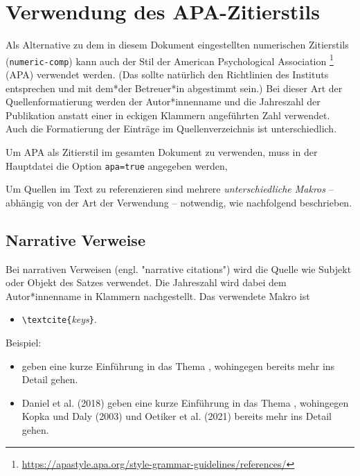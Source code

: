 \section{Verwendung des APA-Zitierstils}
\label{sec:APA}

\begin{sloppypar}
Als Alternative zu dem in diesem Dokument eingestellten numerischen
Zitierstils (\texttt{numeric-comp}) kann auch der Stil der American
Psychological Association%
\footnote{\url{https://apastyle.apa.org/style-grammar-guidelines/references/}}
(APA) verwendet werden. (Das sollte natürlich den Richtlinien des Instituts
entsprechen und mit dem*der Betreuer*in abgestimmt sein.) Bei dieser Art der
Quellenformatierung werden der Autor*innenname und die Jahreszahl der
Publikation anstatt einer in eckigen Klammern angeführten Zahl verwendet.
Auch die Formatierung der Einträge im Quellenverzeichnis ist unterschiedlich.
\end{sloppypar}

Um APA als Zitierstil im gesamten Dokument zu verwenden, muss in der
Hauptdatei die Option \texttt{apa=true} angegeben werden, \zB
%
%
Um Quellen im Text zu referenzieren sind mehrere \emph{unterschiedliche
Makros} -- abhängig von der Art der Verwendung -- notwendig, wie nachfolgend
beschrieben.


\subsection{Narrative Verweise}

Bei narrativen Verweisen (engl. "narrative citations") wird die Quelle wie
Subjekt oder Objekt des Satzes verwendet. Die Jahreszahl wird dabei dem
Autor*innenname in Klammern nachgestellt. Das verwendete Makro ist
%
\begin{itemize}
    \item[] \verb!\textcite{!\textit{keys}\verb!}!.
\end{itemize}
%
Beispiel:
%
\begin{itemize}
\item[]
\begin{LaTeXCode}[numbers=none,breakindent=0pt]
\textcite{Daniel2018} geben eine kurze Einführung in das Thema \latex,
wohingegen \textcite{Oetiker2021, Kopka2003} bereits mehr ins Detail gehen.
\end{LaTeXCode}
\item[]
    Daniel et al. (2018) geben eine kurze Einführung in das Thema \latex,
    wohingegen Kopka und Daly (2003) und Oetiker et al. (2021) bereits mehr ins
    Detail gehen.
\end{itemize}


